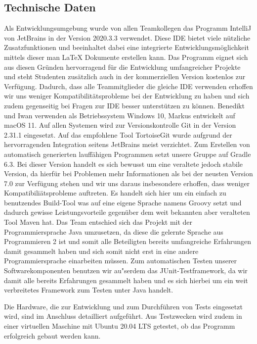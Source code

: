 \subsection{Technische Daten}\label{subsec:technische-daten}
Als Entwicklungsumgebung wurde von allen Teamkollegen das Programm IntelliJ von JetBrains in der Version 2020.3.3 verwendet.
Diese IDE bietet viele n\"utzliche Zusatzfunktionen und beeinhaltet dabei eine integrierte Entwicklungsm\"oglichkeit mittels dieser man LaTeX Dokumente erstellen kann.
Das Programm eignet sich aus diesen Gr\"unden hervorragend f\"ur die Entwicklung umfangreicher Projekte und steht Studenten zus\"atzlich auch in der kommerziellen Version kostenlos zur Verf\"ugung.
Dadurch, dass alle Teammitglieder die gleiche IDE verwenden erhoffen wir uns weniger Kompatibilit\"atsprobleme bei der Entwicklung zu haben und sich zudem gegenseitig bei Fragen zur IDE besser unterst\"utzen zu k\"onnen.
Benedikt und Iwan verwenden als Betriebssystem Windows 10, Markus entwickelt auf macOS 11.
Auf allen Systemen wird zur Versionskontrolle Git in der Version 2.31.1 eingesetzt.
Auf das empfohlene Tool TortoiseGit wurde aufgrund der hervorragenden Integration seitens JetBrains meist verzichtet.
Zum Erstellen von automatisch generierten lauff\"ahigen Programmen setzt unsere Gruppe auf Gradle 6.3.
Bei dieser Version handelt es sich bewusst um eine veraltete jedoch stabile Version, da hierf\"ur bei Problemen mehr Informationen als bei der neusten Version 7.0 zur Verf\"ugung stehen und wir uns daraus insbesondere erhoffen, dass weniger Kompatibili\"atsprobleme auftreten.
Es handelt sich hier um ein einfach zu benutzendes Build-Tool was auf eine eigene Sprache namens Groovy setzt und dadurch gewisse Leistungsvorteile gegen\"uber dem weit bekannten aber veralteten Tool Maven hat.
Das Team entschied sich das Projekt mit der Programmiersprache Java umzusetzen, da diese die gelernte Sprache aus Programmieren 2 ist und somit alle Beteiligten bereits umfangreiche Erfahrungen damit gesammelt haben und sich somit nicht erst in eine andere Programmiersprache einarbeiten m\"ussen.
Zum automatischen Testen unserer Softwarekomponenten benutzen wir au"serdem das JUnit-Testframework, da wir damit alle bereits Erfahrungen gesammelt haben und es sich hierbei um ein weit verbreitetes Framework zum Testen unter Java handelt.

Die Hardware, die zur Entwicklung und zum Durchf\"uhren von Tests eingesetzt wird, sind im Anschluss detailliert aufgef\"uhrt.
Aus Testzwecken wird zudem in einer virtuellen Maschine mit Ubuntu 20.04 LTS getestet, ob das Programm erfolgreich gebaut werden kann.

